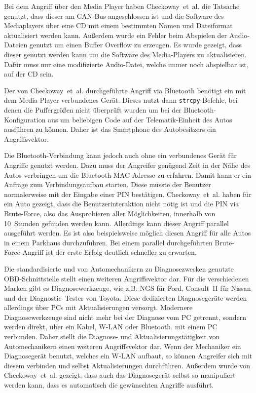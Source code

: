 Bei dem Angriff über den Media Player haben Checkoway~et~al. die Tatsache
genutzt, dass dieser am CAN-Bus angeschlossen ist und die Software des
Mediaplayers über eine CD mit einem bestimmten Namen und Dateiformat
aktualisiert werden kann. Außerdem wurde ein Fehler beim Abspielen der
Audio-Dateien genutzt um einen Buffer Overflow zu erzeugen. Es wurde gezeigt,
dass dieser genutzt werden kann um die Software des Media-Players zu
aktualisieren. Dafür muss nur eine modifizierte Audio-Datei, welche immer noch
abspielbar ist, auf der CD sein.

Der von Checkoway~et~al. durchgeführte Angriff via Bluetooth benötigt ein
mit dem Media Player verbundenes Gerät. Dieses nutzt dann
\verb+strcpy+-Befehle, bei denen die Puffergrößen nicht überprüft wurden um bei
der Bluetooth-Konfiguration aus um beliebigen Code auf der Telematik-Einheit
des Autos ausführen zu können. Daher ist das Smartphone des Autobesitzers ein
Angriffsvektor.

Die Bluetooth-Verbindung kann jedoch auch ohne ein verbundenes Gerät für
Angriffe genutzt werden. Dazu muss der Angreifer genügend Zeit in der Nähe des
Autos verbringen um die Bluetooth-MAC-Adresse zu erfahren. Damit kann er ein
Anfrage zum Verbindungsaufbau starten. Diese müsste der Benutzer normalerweise
mit der Eingabe einer PIN bestätigen. Checkoway~et~al. haben für ein Auto
gezeigt, dass die Benutzerinteraktion nicht nötig ist und die PIN via
Brute-Force, also das Ausprobieren aller Möglichkeiten, innerhalb von
10~Stunden gefunden werden kann. Allerdings kann dieser Angriff parallel
ausgeführt werden. Es ist also beispielsweise möglich diesen Angriff für alle
Autos in einem Parkhaus durchzuführen. Bei einem parallel durchgeführten
Brute-Force-Angriff ist der erste Erfolg deutlich schneller zu erwarten.

Die standardisierte und von Automechanikern zu Diagnosezwecken genutzte
OBD-Schnittstelle stellt einen weiteren Angriffs\-vektor dar. Für die
verschiedenen Marken gibt es Diagnose\-werkzeuge, wie z.B. NGS für Ford,
Consult~II für Nissan und der Diagnostic~Tester von Toyota. Diese dedizierten
Diagnose\-geräte werden allerdings über PCs mit Aktualisierungen versorgt.
Modernere Diagnose\-werkzeuge sind nicht mehr bei der Diagnose vom PC getrennt,
sondern werden direkt, über ein Kabel, \mbox{W-LAN} oder Bluetooth, mit einem PC
verbunden. Daher stellt die Diagnose- und Aktualisierungs\-tätigkeit von
Automechanikern einen weiteren Angriffs\-vektor dar. Wenn der Mechaniker ein
Diagnose\-gerät benutzt, welches ein \mbox{W-LAN} aufbaut, so können Angreifer
sich mit diesem verbinden und selbst Aktualisierungen durchführen. Außerdem
wurde von Checkoway~et~al. gezeigt, dass auch das Diagnose\-gerät selbst so
manipuliert werden kann, dass es automatisch die gewünschten Angriffe ausführt.

